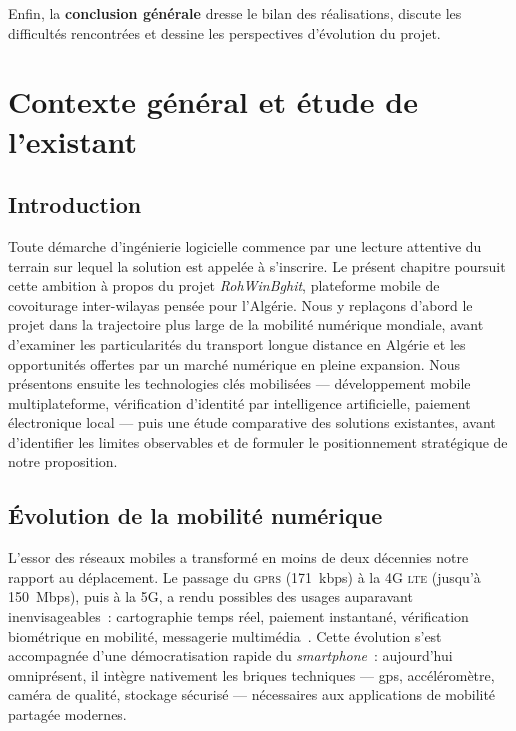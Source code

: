 \documentclass[12pt, a4paper, oneside]{report}
\begin{document}
Enfin, la \textbf{conclusion générale} dresse le bilan des réalisations, discute les difficultés rencontrées et dessine les perspectives d'évolution du projet.


\chapter{Contexte général et étude de l'existant}
\label{chap:etat-art}

\section*{Introduction}

Toute démarche d'ingénierie logicielle commence par une lecture attentive du terrain sur lequel la solution est appelée à s'inscrire. Le présent chapitre poursuit cette ambition à propos du projet \textit{RohWinBghit}, plateforme mobile de covoiturage inter-wilayas pensée pour l'Algérie. Nous y replaçons d'abord le projet dans la trajectoire plus large de la mobilité numérique mondiale, avant d'examiner les particularités du transport longue distance en Algérie et les opportunités offertes par un marché numérique en pleine expansion. Nous présentons ensuite les technologies clés mobilisées --- développement mobile multiplateforme, vérification d'identité par intelligence artificielle, paiement électronique local --- puis une étude comparative des solutions existantes, avant d'identifier les limites observables et de formuler le positionnement stratégique de notre proposition.

\section{Évolution de la mobilité numérique}
\label{sec:mobilite-numerique}

L'essor des réseaux mobiles a transformé en moins de deux décennies notre rapport au déplacement. Le passage du \textsc{gprs} (171~kbps) à la 4G \textsc{lte} (jusqu'à 150~Mbps), puis à la 5G, a rendu possibles des usages auparavant inenvisageables~: cartographie temps réel, paiement instantané, vérification biométrique en mobilité, messagerie multimédia~\cite{arpt_2024}. Cette évolution s'est accompagnée d'une démocratisation rapide du \textit{smartphone}~: aujourd'hui omniprésent, il intègre nativement les briques techniques --- \gls{gps}, accéléromètre, caméra de qualité, stockage sécurisé --- nécessaires aux applications de mobilité partagée modernes.
\end{document}
